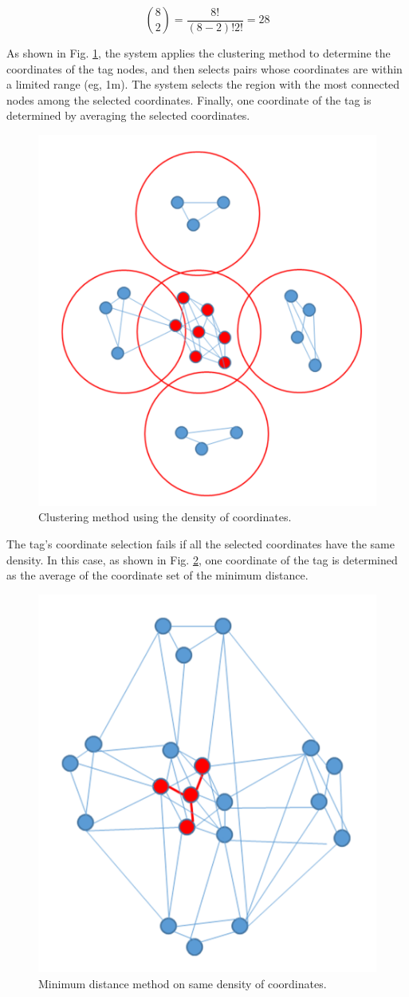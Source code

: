 \documentclass[conference]{IEEEtran}
\begin{document}
\begin{equation}
    \binom{8}{2} = \frac{8!}{(8-2)!2!}=28\label{eq2}
\end{equation}

As shown in Fig. \ref{fig3}, the system applies the clustering method to determine the coordinates of the tag nodes, and then selects pairs whose coordinates are within a limited range (eg, 1m). The system selects the region with the most connected nodes among the selected coordinates. Finally, one coordinate of the tag is determined by averaging the selected coordinates.

\begin{figure}[htbp]
    \centerline{\includegraphics[width=0.62\columnwidth]{fig3.png}}
    \caption{Clustering method using the density of coordinates.}
    \label{fig3}
\end{figure}

The tag's coordinate selection fails if all the selected coordinates have the same density. In this case, as shown in Fig. \ref{fig4}, one coordinate of the tag is determined as the average of the coordinate set of the minimum distance.

\begin{figure}[htbp]
    \centerline{\includegraphics[width=0.62\columnwidth]{fig4.png}}
    \caption{Minimum distance method on same density of coordinates.}
    \label{fig4}
\end{figure}
\end{document}
